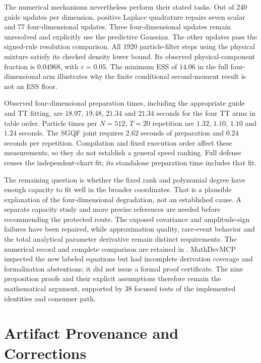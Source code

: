 \documentclass[11pt]{article}
\begin{document}
The numerical mechanisms nevertheless perform their stated tasks. Out of
240 guide updates per dimension, positive Laplace quadrature repairs seven
scalar and 77 four-dimensional updates. Three four-dimensional updates remain
unresolved and explicitly use the predictive Gaussian. The other updates
pass the signed-rule resolution comparison. All 1920 particle-filter steps
using the physical mixture satisfy its checked density lower bound. Its
observed physical-component fraction is $0.04968$, with $\varepsilon=0.05$.
The minimum ESS of $14.06$ in the full four-dimensional arm illustrates why
the finite conditional second-moment result is not an ESS floor.

Observed four-dimensional preparation times, including the appropriate guide
and TT fitting, are $18.97$, $19.48$, $21.34$ and $21.34$ seconds for the four
TT arms in table order. Particle times per $N=512$, $T=20$ repetition are
$1.32$, $1.10$, $1.10$ and $1.24$ seconds. The SGQF joint requires $2.62$
seconds of preparation and $0.24$ seconds per repetition. Compilation and
fixed execution order affect these measurements, so they do not establish
a general speed ranking. Full defense reuses the independent-chart fit;
its standalone preparation time includes that fit.

The remaining question is whether the fixed rank and polynomial degree have
enough capacity to fit well in the broader coordinates. That is a plausible
explanation of the four-dimensional degradation, not an established cause.
A separate capacity study and more precise references are needed before
recommending the protected route. The exposed covariance and amplitude-sign
failures have been repaired, while approximation quality, rare-event behavior
and the total analytical parameter derivative remain distinct requirements.
The numerical record and complete comparison are retained in
.
MathDevMCP inspected the new labeled equations but had incomplete derivation
coverage and formalization abstentions; it did not issue a formal proof
certificate. The nine proposition proofs and their explicit assumptions
therefore remain the mathematical argument, supported by 38 focused tests
of the implemented identities and consumer path.


\appendix
\section{Artifact Provenance and Corrections}
\end{document}
